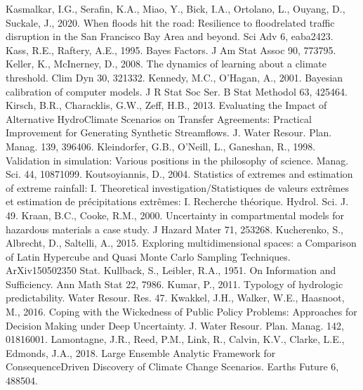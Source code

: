 \documentclass[letterpaper,10pt,english]{sphinxmanual}
\begin{document}
Kasmalkar, I.G., Serafin, K.A., Miao, Y., Bick, I.A., Ortolano, L., Ouyang, D., Suckale, J., 2020. When floods hit the road: Resilience to flood\sphinxhyphen{}related traffic disruption in the San Francisco Bay Area and beyond. Sci Adv 6, eaba2423. 
Kass, R.E., Raftery, A.E., 1995. Bayes Factors. J Am Stat Assoc 90, 773\textendash{}795. 
Keller, K., McInerney, D., 2008. The dynamics of learning about a climate threshold. Clim Dyn 30, 321\textendash{}332. 
Kennedy, M.C., O’Hagan, A., 2001. Bayesian calibration of computer models. J R Stat Soc Ser. B Stat Methodol 63, 425\textendash{}464. 
Kirsch, B.R., Characklis, G.W., Zeff, H.B., 2013. Evaluating the Impact of Alternative Hydro\sphinxhyphen{}Climate Scenarios on Transfer Agreements: Practical Improvement for Generating Synthetic Streamflows. J. Water Resour. Plan. Manag. 139, 396\textendash{}406. 
Kleindorfer, G.B., O’Neill, L., Ganeshan, R., 1998. Validation in simulation: Various positions in the philosophy of science. Manag. Sci. 44, 1087\textendash{}1099.
Koutsoyiannis, D., 2004. Statistics of extremes and estimation of extreme rainfall: I. Theoretical investigation/Statistiques de valeurs extrêmes et estimation de précipitations extrêmes: I. Recherche théorique. Hydrol. Sci. J. 49.
Kraan, B.C., Cooke, R.M., 2000. Uncertainty in compartmental models for hazardous materials \sphinxhyphen{} a case study. J Hazard Mater 71, 253\textendash{}268. 
Kucherenko, S., Albrecht, D., Saltelli, A., 2015. Exploring multi\sphinxhyphen{}dimensional spaces: a Comparison of Latin Hypercube and Quasi Monte Carlo Sampling Techniques. ArXiv150502350 Stat.
Kullback, S., Leibler, R.A., 1951. On Information and Sufficiency. Ann Math Stat 22, 79\textendash{}86. 
Kumar, P., 2011. Typology of hydrologic predictability. Water Resour. Res. 47. 
Kwakkel, J.H., Walker, W.E., Haasnoot, M., 2016. Coping with the Wickedness of Public Policy Problems: Approaches for Decision Making under Deep Uncertainty. J. Water Resour. Plan. Manag. 142, 01816001. 
Lamontagne, J.R., Reed, P.M., Link, R., Calvin, K.V., Clarke, L.E., Edmonds, J.A., 2018. Large Ensemble Analytic Framework for Consequence\sphinxhyphen{}Driven Discovery of Climate Change Scenarios. Earths Future 6, 488\textendash{}504. 
\end{document}
